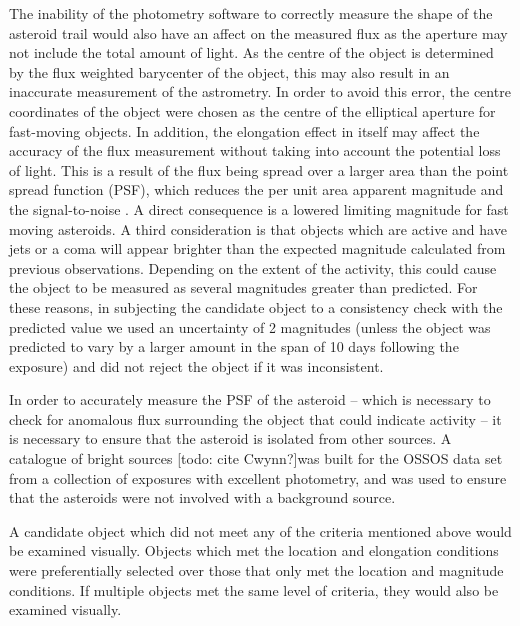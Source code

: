 \documentclass[iop,apj]{emulateapj}
\begin{document}
The inability of the photometry software to correctly measure the shape of the asteroid trail would also have an affect on the measured flux as the aperture may not include the total amount of light. As the centre of the object is determined by the flux weighted barycenter of the object, this may also result in an inaccurate measurement of the astrometry. In order to avoid this error, the centre coordinates of the object were chosen as the centre of the elliptical aperture for fast-moving objects. 
In addition, the elongation effect in itself may affect the accuracy of the flux measurement without taking into account the potential loss of light. This is a result of the flux being spread over a larger area than the point spread function (PSF), which reduces the per unit area apparent magnitude and the signal-to-noise \citep{veres12}. A direct consequence is a lowered limiting magnitude for fast moving asteroids. 
A third consideration is that objects which are active and have jets or a coma will appear brighter than the expected magnitude calculated from previous observations. Depending on the extent of the activity, this could cause the object to be measured as several magnitudes greater than predicted. For these reasons, in subjecting the candidate object to a consistency check with the predicted value we used an uncertainty of 2 magnitudes (unless the object was predicted to vary by a larger amount in the span of 10 days following the exposure) and did not reject the object if it was inconsistent.

In order to accurately measure the PSF of the asteroid -- which is necessary to check for anomalous flux surrounding the object that could indicate activity -- it is necessary to ensure that the asteroid is isolated from other sources. A catalogue of bright sources [todo: cite Cwynn?]was built for the OSSOS data set from a collection of exposures with excellent photometry, and was used to ensure that the asteroids were not involved with a background source.


A candidate object which did not meet any of the criteria mentioned above would be examined visually. Objects which met the location and elongation conditions were preferentially selected over those that only met the location and magnitude conditions. If multiple objects met the same level of criteria, they would also be examined visually.
\end{document}
